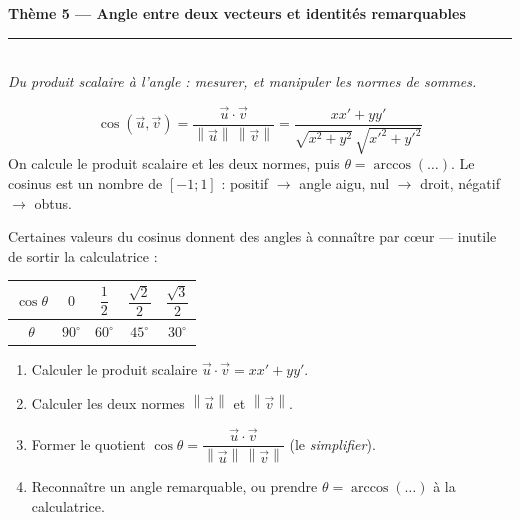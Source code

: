 \documentclass[11pt,a4paper]{article}
\providecommand{\norm}[1]{\left\lVert #1\right\rVert}
\begin{document}
\begin{center}
{\LARGE\bfseries\color{primarydark}Thème 5 — Angle entre deux vecteurs et identités remarquables}\\[2pt]
{\color{primary}\rule{0.82\linewidth}{1.2pt}}\\[4pt]
{\small\itshape Du produit scalaire à l'angle : mesurer, et manipuler les normes de sommes.}
\end{center}
\vspace{1mm}

\begin{rappel}
\[
  \boxed{\;\cos(\vec u,\vec v)=\dfrac{\vec u\cdot\vec v}{\norm{\vec u}\,\norm{\vec v}}
  =\dfrac{x x'+y y'}{\sqrt{x^2+y^2}\,\sqrt{x'^2+y'^2}}\;}
\]
On calcule le produit scalaire et les deux normes, puis $\theta=\arccos(\dots)$. Le cosinus est un
nombre de $[-1;1]$ : positif $\to$ angle aigu, nul $\to$ droit, négatif $\to$ obtus.
\end{rappel}

\begin{idee}
Certaines valeurs du cosinus donnent des angles à connaître par cœur — inutile de sortir la
calculatrice :
\end{idee}

\begin{center}
\renewcommand{\arraystretch}{1.3}
\begin{tabular}{ccccc}
\toprule
\rowcolor{primary!12}$\cos\theta$ & $0$ & $\dfrac12$ & $\dfrac{\sqrt2}{2}$ & $\dfrac{\sqrt3}{2}$\\
\midrule
$\theta$ & $90^\circ$ & $60^\circ$ & $45^\circ$ & $30^\circ$\\
\bottomrule
\end{tabular}
\end{center}

\begin{methode}
\begin{enumerate}[leftmargin=1.7em,topsep=2pt,itemsep=2pt]
  \item Calculer le produit scalaire $\vec u\cdot\vec v=xx'+yy'$.
  \item Calculer les deux normes $\norm{\vec u}$ et $\norm{\vec v}$.
  \item Former le quotient $\cos\theta=\dfrac{\vec u\cdot\vec v}{\norm{\vec u}\,\norm{\vec v}}$
        (le \emph{simplifier}).
  \item Reconnaître un angle remarquable, ou prendre $\theta=\arccos(\dots)$ à la calculatrice.
\end{enumerate}
\end{methode}
\end{document}

